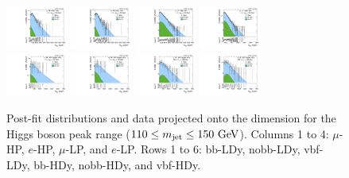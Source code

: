 \begin{figure}[htbp]
  \includegraphics[width=0.18\textwidth]{fig/fitValidation/PostFit_SR_MVV_MJJ110to150__mu_HP_nobb_HDy_Run2.pdf}
  \includegraphics[width=0.18\textwidth]{fig/fitValidation/PostFit_SR_MVV_MJJ110to150__e_HP_nobb_HDy_Run2.pdf}
  \includegraphics[width=0.18\textwidth]{fig/fitValidation/PostFit_SR_MVV_MJJ110to150__mu_LP_nobb_HDy_Run2.pdf}
  \includegraphics[width=0.18\textwidth]{fig/fitValidation/PostFit_SR_MVV_MJJ110to150__e_LP_nobb_HDy_Run2.pdf}\\
  \includegraphics[width=0.18\textwidth]{fig/fitValidation/PostFit_SR_MVV_MJJ110to150__mu_HP_vbf_HDy_Run2.pdf}
  \includegraphics[width=0.18\textwidth]{fig/fitValidation/PostFit_SR_MVV_MJJ110to150__e_HP_vbf_HDy_Run2.pdf}
  \includegraphics[width=0.18\textwidth]{fig/fitValidation/PostFit_SR_MVV_MJJ110to150__mu_LP_vbf_HDy_Run2.pdf}
  \includegraphics[width=0.18\textwidth]{fig/fitValidation/PostFit_SR_MVV_MJJ110to150__e_LP_vbf_HDy_Run2.pdf}\\
  \caption{
    Post-fit distributions and data projected onto the \MVV dimension for the Higgs boson peak range ($110\leq\MJ\leq150\unit{GeV}$).
    Columns 1 to 4: $\mu$-HP, $e$-HP, $\mu$-LP, and $e$-LP.
    Rows 1 to 6: bb-LDy, nobb-LDy, vbf-LDy, bb-HDy, nobb-HDy, and vbf-HDy.
  }
  \label{fig:postfit_MVV_MJJ110to150_Run2}
\end{figure}

